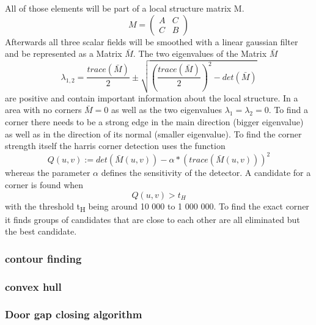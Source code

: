 All of those elements will be part of a local structure matrix M.
\[M = \begin{pmatrix} A & C \\ C & B \end{pmatrix}\]
Afterwards all three scalar fields will be smoothed with a linear gaussian filter and be represented as a Matrix \begin{math}\bar{M}\end{math}.
The two eigenvalues of the Matrix \begin{math}\bar{M}\end{math}
\[\lambda_{1,2} = \dfrac{trace(\bar{M})}{2} \pm \sqrt{(\dfrac{trace(\bar{M})}{2})^2 - det(\bar{M})} \]
are positive and contain important information about the local structure. In a area with no corners \begin{math}\bar{M} = 0\end{math}  as well as the two eigenvalues \begin{math}\lambda_1 = \lambda_2 = 0\end{math}. To find a corner there needs to be a strong edge in the main direction (bigger eigenvalue) as well as in the direction of its normal (smaller eigenvalue). 
To find the corner strength itself the harris corner detection uses the function 
\[Q(u,v) := det(\bar{M}(u,v)) - \alpha * (trace(\bar{M}(u,v)))^2\]
whereas the parameter \begin{math}\alpha\end{math} defines the sensitivity of the detector. A candidate for a corner is found when
\[Q(u,v) > t_H\]
with the threshold t\textsubscript{H} being around 10 000 to 1 000 000. To find the exact corner it finds groups of candidates that are close to each other are all eliminated but the best candidate.

\subsubsection{contour finding}
\subsubsection{convex hull}
\subsubsection{Door gap closing algorithm}

